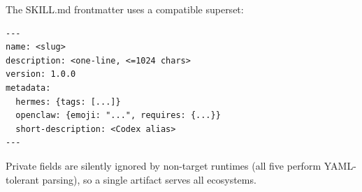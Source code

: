 \documentclass{article}
\begin{document}
The SKILL.md frontmatter uses a compatible superset:
\begin{verbatim}
---
name: <slug>
description: <one-line, <=1024 chars>
version: 1.0.0
metadata:
  hermes: {tags: [...]}
  openclaw: {emoji: "...", requires: {...}}
  short-description: <Codex alias>
---
\end{verbatim}
Private fields are silently ignored by non-target runtimes (all five perform YAML-tolerant parsing), so a single artifact serves all ecosystems.
\end{document}

